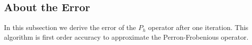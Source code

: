 %


\subsection{About the Error}
In this subsection we derive the error of the $P_h$ operator after
one iteration. This algorithm is first order accuracy to approximate
the Perron-Frobenious operator.


